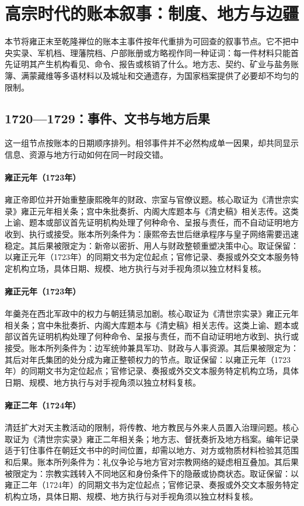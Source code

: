 \section{高宗时代的账本叙事：制度、地方与边疆}
本节将雍正末至乾隆禅位的账本主事件按年代重排为可回查的叙事节点。它不把中央实录、军机档、理藩院档、户部账册或方略视作同一种证词：每一件材料只能首先证明其产生机构看见、命令、报告或核销了什么。地方志、契约、矿业与盐务账簿、满蒙藏维等多语材料以及城址和交通遗存，为国家档案提供了必要却不均匀的限制。
\subsection{1720—1729：事件、文书与地方后果}
这一组节点按账本的日期顺序排列。相邻事件并不必然构成单一因果，却共同显示信息、资源与地方行动如何在同一时段交错。
\hypertarget{ledger:EQ-1723-YONGZHENG-ACCESSION}{}\paragraph{雍正元年（1723年）}雍正帝即位并开始重整康熙晚年的财政、宗室与官僚议题。核心取证为《清世宗实录》雍正元年相关条；宫中朱批奏折、内阁大库题本与《清史稿》相关志传。这类上谕、题本或部议首先证明机构处理了何种命令、呈报与责任，而不自动证明地方收到、执行或接受。账本所列条件为：康熙帝去世后继承程序与皇子网络需要迅速稳定。其后果被限定为：新帝以密折、用人与财政整顿重塑决策中心。取证保留：以雍正元年（1723年）的同期文书为定位起点；官修记录、奏报或外交文本服务特定机构立场，具体日期、规模、地方执行与对手视角须以独立材料复核。
\hypertarget{ledger:EQ-1723-JI-ZENGYUN-CASE}{}\paragraph{雍正元年（1723年）}年羹尧在西北军政中的权力与朝廷猜忌加剧。核心取证为《清世宗实录》雍正元年相关条；宫中朱批奏折、内阁大库题本与《清史稿》相关志传。这类上谕、题本或部议首先证明机构处理了何种命令、呈报与责任，而不自动证明地方收到、执行或接受。账本所列条件为：边军统帅兼具军功、财政与人事资源。其后果被限定为：其后对年氏集团的处分成为雍正整顿权力的节点。取证保留：以雍正元年（1723年）的同期文书为定位起点；官修记录、奏报或外交文本服务特定机构立场，具体日期、规模、地方执行与对手视角须以独立材料复核。
\hypertarget{ledger:EQ-1724-CATHOLIC-PROSCRIPTION}{}\paragraph{雍正二年（1724年）}清廷扩大对天主教活动的限制，将传教、地方教民与外来人员置入治理问题。核心取证为《清世宗实录》雍正二年相关条；地方志、督抚奏折及地方档案。编年记录适于钉住事件在朝廷文书中的时间位置，却需以地方、对方或物质材料检验其范围和后果。账本所列条件为：礼仪争论与地方官对宗教网络的疑虑相互叠加。其后果被限定为：宗教实践转入不同地区和身份条件下的隐蔽或协商状态。取证保留：以雍正二年（1724年）的同期文书为定位起点；官修记录、奏报或外交文本服务特定机构立场，具体日期、规模、地方执行与对手视角须以独立材料复核。
